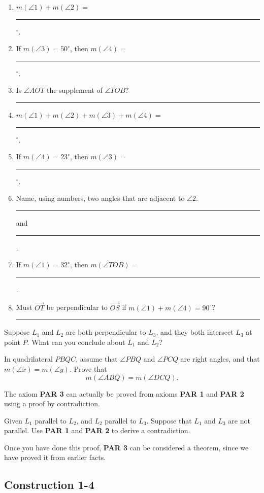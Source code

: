 \documentclass[12pt]{book} %
\begin{document}
\begin{ExerciseList}

\begin{enumerate}
	\item[(a)] $m(\angle 1)+m(\angle 2)=$ \rule{2cm}{0.4pt} $^\circ$.
	\item[(b)] If $m(\angle 3)=50^\circ$, then $m(\angle 4)=$ \rule{2cm}{0.4pt} $^\circ$.
	\item[(c)] Is $\angle AOT$ the supplement of $\angle TOB$? \rule{2.5cm}{0.4pt}
	\item[(d)] $m(\angle 1)+m(\angle 2)+m(\angle 3)+m(\angle 4)=$ \rule{2cm}{0.4pt} $^\circ$.
	\item[(e)] If $m(\angle 4)=23^\circ$, then $m(\angle 3)=$ \rule{2cm}{0.4pt} $^\circ$.
	\item[(f)] Name, using numbers, two angles that are adjacent to $\angle 2$. \rule{2cm}{0.4pt} and \rule{2cm}{0.4pt}.
	\item[(g)] If $m(\angle 1)=32^\circ$, then $m(\angle TOB)=$ \rule{2cm}{0.4pt}.
	\item[(h)] Must $\overrightarrow{OT}$ be perpendicular to $\overrightarrow{OS}$ if $m(\angle 1)+m(\angle 4)=90^\circ$? \rule{2.5cm}{0.4pt}
\end{enumerate}

\Exercise Suppose $L_1$ and $L_2$ are both perpendicular to $L_3$, and they both intersect $L_3$ at point $P$. What can you conclude about $L_1$ and $L_2$?

\Exercise In quadrilateral $PBQC$, assume that $\angle PBQ$ and $\angle PCQ$ are right angles, and that $m(\angle x)=m(\angle y)$. Prove that
\[
m(\angle ABQ)=m(\angle DCQ).
\]


\Exercise The axiom \textbf{PAR 3} can actually be proved from axioms \textbf{PAR 1} and \textbf{PAR 2} using a proof by contradiction.

Given $L_1$ parallel to $L_2$, and $L_2$ parallel to $L_3$. Suppose that $L_1$ and $L_3$ are not parallel. Use \textbf{PAR 1} and \textbf{PAR 2} to derive a contradiction.

Once you have done this proof, \textbf{PAR 3} can be considered a theorem, since we have proved it from earlier facts.
\end{ExerciseList}

\subsection*{Construction 1-4}
\end{document}
